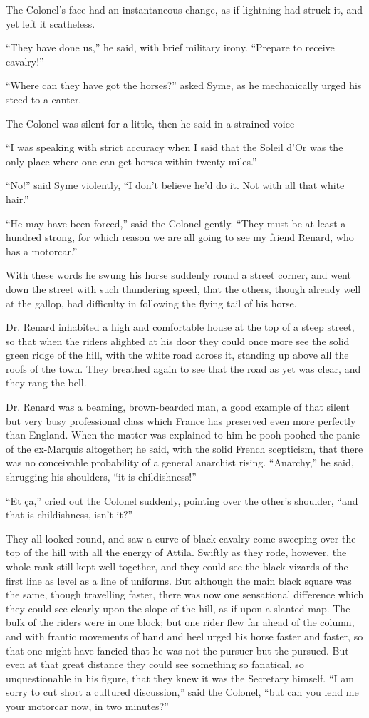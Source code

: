 The Colonel’s face had an instantaneous change, as if lightning had struck it, and yet left it scatheless.

“They have done us,” he said, with brief military irony. “Prepare to receive cavalry!”

“Where can they have got the horses?” asked Syme, as he mechanically urged his steed to a canter.

The Colonel was silent for a little, then he said in a strained voice⁠—

“I was speaking with strict accuracy when I said that the Soleil d’Or was the only place where one can get horses within twenty miles.”

“No!” said Syme violently, “I don’t believe he’d do it. Not with all that white hair.”

“He may have been forced,” said the Colonel gently. “They must be at least a hundred strong, for which reason we are all going to see my friend Renard, who has a motorcar.”

With these words he swung his horse suddenly round a street corner, and went down the street with such thundering speed, that the others, though already well at the gallop, had difficulty in following the flying tail of his horse.

Dr. Renard inhabited a high and comfortable house at the top of a steep street, so that when the riders alighted at his door they could once more see the solid green ridge of the hill, with the white road across it, standing up above all the roofs of the town. They breathed again to see that the road as yet was clear, and they rang the bell.

Dr. Renard was a beaming, brown-bearded man, a good example of that silent but very busy professional class which France has preserved even more perfectly than England. When the matter was explained to him he pooh-poohed the panic of the ex-Marquis altogether; he said, with the solid French scepticism, that there was no conceivable probability of a general anarchist rising. “Anarchy,” he said, shrugging his shoulders, “it is childishness!”

“Et ça,” cried out the Colonel suddenly, pointing over the other’s shoulder, “and that is childishness, isn’t it?”

They all looked round, and saw a curve of black cavalry come sweeping over the top of the hill with all the energy of Attila. Swiftly as they rode, however, the whole rank still kept well together, and they could see the black vizards of the first line as level as a line of uniforms. But although the main black square was the same, though travelling faster, there was now one sensational difference which they could see clearly upon the slope of the hill, as if upon a slanted map. The bulk of the riders were in one block; but one rider flew far ahead of the column, and with frantic movements of hand and heel urged his horse faster and faster, so that one might have fancied that he was not the pursuer but the pursued. But even at that great distance they could see something so fanatical, so unquestionable in his figure, that they knew it was the Secretary himself. “I am sorry to cut short a cultured discussion,” said the Colonel, “but can you lend me your motorcar now, in two minutes?”

